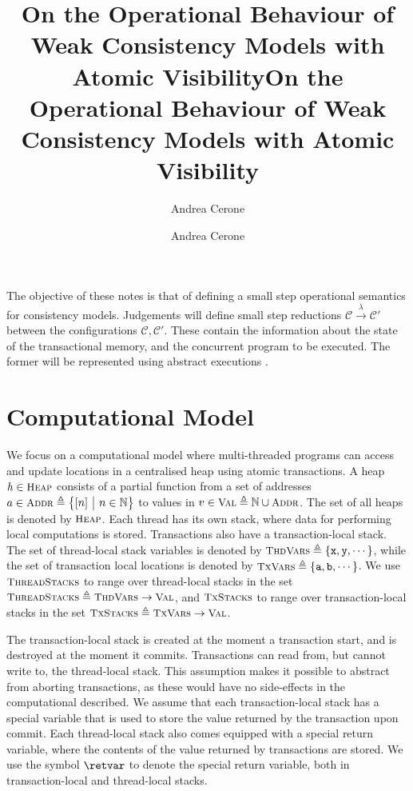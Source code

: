 \documentclass[a4paper,UKenglish]{article}%
\title{On the Operational Behaviour of Weak Consistency Models with Atomic Visibility}
\title{On the Operational Behaviour of Weak Consistency Models with Atomic Visibility}
\author[1]{Andrea Cerone}
\affil[1]{Imperial College London, UK}
\author[1]{Andrea Cerone}
\affil[1]{Imperial College London, UK, \texttt{a.cerone@imperial.ac.uk}}
\theoremstyle{plain}
\begin{document}
\maketitle
The objective of these notes is that of defining a small step operational semantics for 
consistency models. Judgements will define small step reductions $\mathcal{C} \xrightarrow{\lambda} \mathcal{C'}$ 
between the configurations $\mathcal{C}, \mathcal{C'}$. These contain the information about the state of the 
transactional memory, and the concurrent program to be executed. The former will be represented using 
abstract executions \cite{framework-concur}.

\section{Computational Model}
We focus on a computational model where multi-threaded programs can access and update 
locations in a centralised heap using atomic transactions. A heap $\h \in \Heaps$ consists of a partial function 
from a set of addresses $\addr \in \Addr \defeq \Setcon{ [\nat] }{\nat \in \Nat }$ to values in $ \val \in \Val \defeq \Nat \cup \Addr$. 
The set of all heaps is denoted by $\Heaps$. 
Each thread has its own stack, 
where data for performing local computations is stored. Transactions also 
have a transaction-local stack. 
The set of thread-local stack variables is denoted by $\ThreadVars \defeq \{\pvar{x}, \pvar{y}, \cdots\}$, 
while the set of transaction local locations is denoted by $\TxVars \defeq \{\pvar{a}, \pvar{b}, \cdots\}$. 
We use $\ThdStacks$ to range over thread-local stacks in the set $\ThdStacks \defeq \ThreadVars \to \Val$, 
and $\TxStacks$ to range over transaction-local stacks in the set $\TxStacks \defeq \TxVars \to \Val$.

The transaction-local stack is created at the moment a transaction start, 
and is destroyed at the moment it commits. 
Transactions can read from, but cannot 
write to, the thread-local stack. This assumption makes it possible to abstract from 
aborting transactions, as these would have no side-effects in the computational described. 
We assume that each transaction-local 
stack has a special variable that is used to store the value returned by the transaction 
upon commit. Each thread-local stack also comes equipped with a special return variable, 
where the contents of the value returned by transactions are stored. We use the symbol 
$\retvar$ to denote the special return variable, both in transaction-local and thread-local 
stacks.
\end{document}
